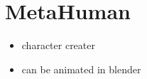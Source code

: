 \chapter{MetaHuman}
    \begin{itemize}
        \item character creater
        \item can be animated in blender
    \end{itemize}